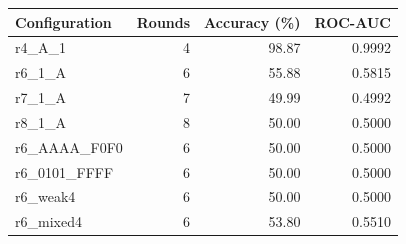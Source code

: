 \begin{tabular}{lrrr}
Configuration & Rounds & Accuracy (\%) & ROC-AUC \\
\hline
r4\_A\_1 & 4 & 98.87 & 0.9992 \\
r6\_1\_A & 6 & 55.88 & 0.5815 \\
r7\_1\_A & 7 & 49.99 & 0.4992 \\
r8\_1\_A & 8 & 50.00 & 0.5000 \\
r6\_AAAA\_F0F0 & 6 & 50.00 & 0.5000 \\
r6\_0101\_FFFF & 6 & 50.00 & 0.5000 \\
r6\_weak4 & 6 & 50.00 & 0.5000 \\
r6\_mixed4 & 6 & 53.80 & 0.5510 \\
\end{tabular}
